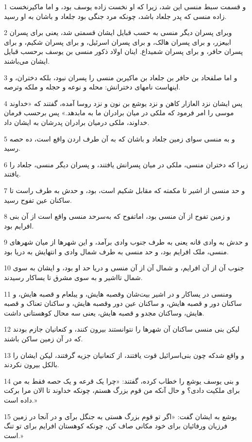 \par 1 و قسمت سبط منسی این شد، زیرا که او نخست زاده یوسف بود، و اما ماکیرنخست زاده منسی که پدر جلعاد باشد، چونکه مرد جنگی بود جلعاد و باشان به او رسید.
\par 2 وبرای پسران دیگر منسی به حسب قبایل ایشان قسمتی شد، یعنی برای پسران ابیعزر، و برای پسران هالک، و برای پسران اسرئیل، و برای پسران شکیم، و برای پسران حافر، و برای پسران شمیداع. اینان اولاد ذکور منسی بن یوسف برحسب قبایل ایشان می‌باشند.
\par 3 و اما صلفحاد بن حافر بن جلعاد بن ماکیربن منسی را پسران نبود، بلکه دختران، و اینهاست نامهای دخترانش: محله و نوعه و حجله و ملکه وترصه.
\par 4 پس ایشان نزد العازار کاهن و نزد یوشع بن نون و نزد روسا آمده، گفتند که «خداوند موسی را امر فرمود که ملکی در میان برادران ما به مابدهد.» پس برحسب فرمان خداوند، ملکی درمیان برادران پدرشان به ایشان داد.
\par 5 و به منسی سوای زمین جلعاد و باشان که به آن طرف اردن واقع است، ده حصه رسید.
\par 6 زیرا که دختران منسی، ملکی در میان پسرانش یافتند، و پسران دیگر منسی، جلعاد را یافتند.
\par 7 و حد منسی از اشیر تا مکمته که مقابل شکیم است، بود، و حدش به طرف راست تا ساکنان عین تفوح رسید.
\par 8 و زمین تفوح از آن منسی بود، اماتفوح که به‌سرحد منسی واقع است از آن بنی افرایم بود.
\par 9 و حدش به وادی قانه یعنی به طرف جنوب وادی برآمد، و این شهرها از میان شهرهای منسی، ملک افرایم بود، و حد منسی به طرف شمال وادی و انتهایش به دریا بود.
\par 10 جنوب آن از آن افرایم، و شمال آن از آن منسی و دریا حد او بود، و ایشان به سوی شمال تااشیر و به سوی مشرق تا یساکار رسیدند.
\par 11 ومنسی در یساکار و در اشیر بیت‌شان وقصبه هایش، و یبلعام و قصبه هایش، و ساکنان دور و قصبه هایش، و ساکنان عین دور وقصبه هایش، و ساکنان تعناک و قصبه هایش، وساکنان مجدو و قصبه هایش، یعنی سه محال کوهستانی داشت.
\par 12 لیکن بنی منسی ساکنان آن شهرها را نتوانستند بیرون کنند، و کنعانیان جازم بودند که در آن زمین ساکن باشند.
\par 13 و واقع شدکه چون بنی‌اسرائیل قوت یافتند، از کنعانیان جزیه گرفتند، لیکن ایشان را بالکل بیرون نکردند.
\par 14 و بنی یوسف یوشع را خطاب کرده، گفتند: «چرا یک قرعه و یک حصه فقط به من برای ملکیت دادی؟ و حال آنکه من قوم بزرگ هستم، چونکه خداوند تا الان مرا برکت داده است.»
\par 15 یوشع به ایشان گفت: «اگر تو قوم بزرگ هستی به جنگل برآی و در آنجا در زمین فرزیان ورفائیان برای خود مکانی صاف کن، چونکه کوهستان افرایم برای تو تنگ است.»
